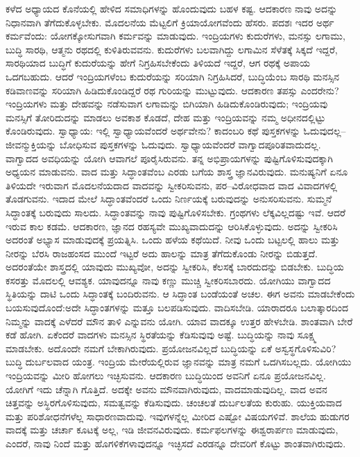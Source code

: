 ಕಳೆದ ಅಧ್ಯಾಯದ ಕೊನೆಯಲ್ಲಿ ಹೇಳಿದ ಸಮಾಧಿಗಳನ್ನು ಹೊಂದುವುದು ಬಹಳ ಕಷ್ಟ. ಆದಕಾರಣ ನಾವು ಅದನ್ನು ನಿಧಾನವಾಗಿ ತೆಗೆದುಕೊಳ್ಳಬೇಕು. ಮೊದಲನೆಯ ಮೆಟ್ಟಲಿಗೆ ಕ್ರಿಯಾಯೋಗವೆಂದು ಹೆಸರು. ಪದಶಃ ಇದರ ಅರ್ಥ ಕರ್ಮವೆಂದು: ಯೋಗಕ್ಕೋಸುಗವಾಗಿ ಕರ್ಮವನ್ನು ಮಾಡುವುದು. ಇಂದ್ರಿಯಗಳು ಕುದುರೆಗಳು, ಮನಸ್ಸು ಲಗಾಮು, ಬುದ್ಧಿ ಸಾರಥಿ, ಆತ್ಮನು ರಥದಲ್ಲಿ ಕುಳಿತಿರುವವನು. ಕುದುರೆಗಳು ಬಲವಾಗಿದ್ದು ಲಗಾಮಿನ ಸೆಳೆತಕ್ಕೆ ಸಿಕ್ಕದೆ ಇದ್ದರೆ, ಸಾರಥಿಯಾದ ಬುದ್ಧಿಗೆ ಕುದುರೆಯನ್ನು ಹೇಗೆ ನಿಗ್ರಹಿಸಬೇಕೆಂದು ತಿಳಿಯದೆ ಇದ್ದರೆ, ಆಗ ರಥಕ್ಕೆ ಅಪಾಯ ಒದಗಬಹುದು. ಆದರೆ ಇಂದ್ರಿಯಗಳೆಂಬ ಕುದುರೆಯನ್ನು ಸರಿಯಾಗಿ ನಿಗ್ರಹಿಸಿದರೆ, ಬುದ್ಧಿಯೆಂಬ ಸಾರಥಿ ಮನಸ್ಸಿನ ಕಡಿವಾಣವನ್ನು ಸರಿಯಾಗಿ ಹಿಡಿದುಕೊಂಡಿದ್ದರೆ ರಥ ಗುರಿಯನ್ನು ಮುಟ್ಟುವುದು. ಆದಕಾರಣ ತಪಸ್ಸು ಎಂದರೇನು? ಇಂದ್ರಿಯಗಳು ಮತ್ತು ದೇಹವನ್ನು ನಡೆಸುವಾಗ ಲಗಾಮನ್ನು ಬಿಗಿಯಾಗಿ ಹಿಡಿದುಕೊಂಡಿರುವುದು; ಇಂದ್ರಿಯವು ಮನಸ್ಸಿಗೆ ತೋರಿದುದನ್ನು ಮಾಡಲು ಅವಕಾಶ ಕೊಡದೆ, ದೇಹ ಮತ್ತು ಇಂದ್ರಿಯವನ್ನು ನಮ್ಮ ಅಧೀನದಲ್ಲಿಟ್ಟು ಕೊಂಡಿರುವುದು. ಸ್ವಾಧ್ಯಾಯ: ಇಲ್ಲಿ ಸ್ವಾಧ್ಯಾಯವೆಂದರೆ ಅರ್ಥವೇನು? ಕಾದಂಬರಿ ಕಥೆ ಪುಸ್ತಕಗಳನ್ನು ಓದುವುದಲ್ಲ–ಜೀವನ್ಮುಕ್ತಿಯನ್ನು ಬೋಧಿಸುವ ಪುಸ್ತಕಗಳನ್ನು ಓದುವುದು. ಸ್ವಾಧ್ಯಾಯವೆಂದರೆ ವಾಗ್ವಾದಪೂರಿತವಾದುದಲ್ಲ. ವಾಗ್ವಾದದ ಅವಧಿಯನ್ನು ಯೋಗಿ ಆವಾಗಲೆ ಪೂರೈಸಿರುವನು. ತನ್ನ ಅಭಿಪ್ರಾಯಗಳನ್ನು ಪುಷ್ಟಿಗೊಳಿಸುವುದಕ್ಕಾಗಿ ಅಧ್ಯಯನ ಮಾಡುವನು. ವಾದ ಮತ್ತು ಸಿದ್ಧಾಂತವೆಂಬ ಎರಡು ಬಗೆಯ ಶಾಸ್ತ್ರ ಜ್ಞಾನವಿರುವುದು. ಮನುಷ್ಯನಿಗೆ ಏನೂ ತಿಳಿಯದೇ ಇರುವಾಗ ಮೊದಲನೆಯದಾದ ವಾದವನ್ನು ಸ್ವೀಕರಿಸುವನು, ಪರ–ವಿರೋಧವಾದ ವಾದ ವಿವಾದಗಳಲ್ಲಿ ತೊಡಗುವನು. ಇದಾದ ಮೇಲೆ ಸಿದ್ಧಾಂತವೆಂದರೆ ಒಂದು ನಿರ್ಣಯಕ್ಕೆ ಬರುವುದನ್ನು ಅನುಸರಿಸುವನು. ಸುಮ್ಮನೆ ಸಿದ್ಧಾಂತಕ್ಕೆ ಬರುವುದು ಸಾಲದು. ಸಿದ್ಧಾಂತವನ್ನು ನಾವು ಪುಷ್ಟಿಗೊಳಿಸಬೇಕು. ಗ್ರಂಥಗಳು ಲೆಕ್ಕವಿಲ್ಲದಷ್ಟು ಇವೆ. ಆದರೆ ಇರುವ ಕಾಲ ಕಡಮೆ. ಆದಕಾರಣ, ಜ್ಞಾನದ ರಹಸ್ಯವೇ ಮುಖ್ಯವಾದುದನ್ನು ಆರಿಸಿಕೊಳ್ಳುವುದು. ಅದನ್ನು ಸ್ವೀಕರಿಸಿ ಅದರಂತೆ ಅಭ್ಯಾಸ ಮಾಡುವುದಕ್ಕೆ ಪ್ರಯತ್ನಿಸಿ. ಒಂದು ಹಳೆಯ ಕಥೆಯಿದೆ. ನೀವು ಒಂದು ಬಟ್ಟಲಲ್ಲಿ ಹಾಲು ಮತ್ತು ನೀರನ್ನು ಬೆರಸಿ ರಾಜಹಂಸದ ಮುಂದೆ ಇಟ್ಟರೆ ಅದು ಹಾಲನ್ನು ಮಾತ್ರ ತೆಗೆದುಕೊಂಡು ನೀರನ್ನು ಬಿಡುತ್ತದೆ. ಅದರಂತೆಯೇ ಶಾಸ್ತ್ರದಲ್ಲಿ ಯಾವುದು ಮುಖ್ಯವೋ, ಅದನ್ನು ಸ್ವೀಕರಿಸಿ, ಕೆಲಸಕ್ಕೆ ಬಾರದುದನ್ನು ಬಿಡಬೇಕು. ಬುದ್ಧಿಯ ಕಸರತ್ತು ಮೊದಲಲ್ಲಿ ಆವಶ್ಯಕ. ಯಾವುದನ್ನೂ ನಾವು ಕಣ್ಣು ಮುಚ್ಚಿ ಸ್ವೀಕರಿಸಬಾರದು. ಯೋಗಿಯು ವಾಗ್ವಾದದ ಸ್ಥಿತಿಯನ್ನು ದಾಟಿ ಒಂದು ಸಿದ್ಧಾಂತಕ್ಕೆ ಬಂದಿರುವನು. ಆ ಸಿದ್ಧಾಂತ ಬಂಡೆಯಂತೆ ಅಚಲ. ಈಗ ಅವನು ಮಾಡಬೇಕೆಂದು ಬಯಸುವುದೊಂದೆ:ಅದೇ ಸಿದ್ಧಾಂತಗಳನ್ನು ಮತ್ತೂ ಬಲಪಡಿಸುವುದು. ವಾದಿಸಬೇಡಿ. ಯಾರಾದರೂ ಬಲಾತ್ಕಾರದಿಂದ ನಿಮ್ಮನ್ನು ವಾದಕ್ಕೆ ಎಳೆದರೆ ಮೌನ ತಾಳಿ ಎನ್ನುವನು ಯೋಗಿ. ಯಾವ ವಾದಕ್ಕೂ ಉತ್ತರ ಹೇಳಬೇಡಿ. ಶಾಂತವಾಗಿ ಬೇರೆ ಕಡೆ ಹೋಗಿ. ಏಕೆಂದರೆ ವಾದಗಳು ಮನಸ್ಸಿನ ಸ್ಥಿರತೆಯನ್ನು ಕೆಡಿಸುವುವು ಅಷ್ಟೆ. ಬುದ್ಧಿಯನ್ನು ನಾವು ಸೂಕ್ಷ್ಮ ಮಾಡಬೇಕು. ಅದೊಂದೇ ನಮಗೆ ಬೇಕಾಗಿರುವುದು. ಪ್ರಯೋಜನವಿಲ್ಲದೆ ಬುದ್ಧಿಯನ್ನು ಏಕೆ ಅಸ್ವಸ್ಥಗೊಳಿಸುವಿರಿ? ಬುದ್ಧಿ ದುರ್ಬಲವಾದ ಯಂತ್ರ. ಇಂದ್ರಿಯ ಮೇರೆಯಲ್ಲಿರುವ ಜ್ಞಾನವನ್ನು ಮಾತ್ರ ನಮಗೆ ಒದಗಿಸಬಲ್ಲದು. ಯೋಗಿಯು ಇಂದ್ರಿಯವನ್ನು ಮೀರಿ ಹೋಗಲು ಇಚ್ಛಿಸುವನು. ಆದಕಾರಣ ಬುದ್ಧಿಯಿಂದ ಅವನಿಗೆ ಏನೂ ಪ್ರಯೋಜನವಿಲ್ಲ. ಯೋಗಿಗೆ ಇದು ಚೆನ್ನಾಗಿ ಗೊತ್ತಿದೆ. ಅದಕ್ಕೇ ಅವನು ಮೌನವಾಗಿರುವುದು, ವಾದಮಾಡುವುದಿಲ್ಲ. ವಾದ ಅವನ ಚಿತ್ತವನ್ನು ಅಸ್ಥಿರಗೊಳಿಸುವುದು, ಸಮತ್ವವನ್ನು ಕೆಡಿಸುವುದು. ಚಂಚಲತೆ ದುರ್ಬಲತೆಯ ಕುರುಹು. ಯುಕ್ತಿಯವಾದ ಮತ್ತು ಪರಿಶೋಧನೆಗಳೆಲ್ಲ ಸಾಧಾರಣವಾದುವು. ಇವುಗಳನ್ನೆಲ್ಲ ಮೀರಿದ ಎಷ್ಟೋ ವಿಷಯಗಳಿವೆ. ಶಾಲೆಯ ಹುಡುಗರ ವಾದಕ್ಕೆ ಮತ್ತು ಚರ್ಚಾ ಕೂಟಕ್ಕೆ ಅಲ್ಲ, ಇಡಿ ಜೀವನವಿರುವುದು. ಕರ್ಮಫಲಗಳನ್ನು ಈಶ್ವರಾರ್ಪಣ ಮಾಡುವುದು, ಎಂದರೆ, ನಾವು ನಿಂದೆ ಮತ್ತು ಹೊಗಳಿಕೆಗಳಾವುದನ್ನೂ ಇಚ್ಛಿಸದೆ ಎರಡನ್ನೂ ದೇವರಿಗೆ ಕೊಟ್ಟು ಶಾಂತವಾಗಿರುವುದು. 

